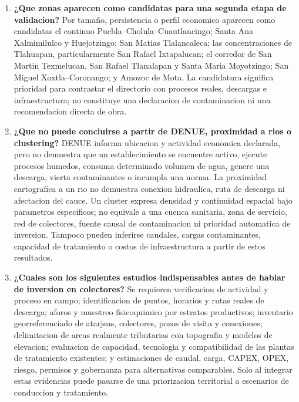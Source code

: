 \documentclass[11pt,letterpaper]{article}
\begin{document}
\begin{enumerate}
    \item \textbf{¿Que zonas aparecen como candidatas para una segunda etapa de validacion?}
    Por tamaño, persistencia o perfil economico aparecen como candidatas el continuo Puebla--Cholula--Cuautlancingo; Santa Ana Xalmimilulco y Huejotzingo; San Matias Tlalancaleca; las concentraciones de Tlahuapan, particularmente San Rafael Ixtapalucan; el corredor de San Martin Texmelucan, San Rafael Tlanalapan y Santa Maria Moyotzingo; San Miguel Xoxtla--Coronango; y Amozoc de Mota. La candidatura significa prioridad para contrastar el directorio con procesos reales, descargas e infraestructura; no constituye una declaracion de contaminacion ni una recomendacion directa de obra.

    \item \textbf{¿Que no puede concluirse a partir de DENUE, proximidad a rios o clustering?}
    DENUE informa ubicacion y actividad economica declarada, pero no demuestra que un establecimiento se encuentre activo, ejecute procesos humedos, consuma determinado volumen de agua, genere una descarga, vierta contaminantes o incumpla una norma. La proximidad cartografica a un rio no demuestra conexion hidraulica, ruta de descarga ni afectacion del cauce. Un cluster expresa densidad y continuidad espacial bajo parametros especificos; no equivale a una cuenca sanitaria, zona de servicio, red de colectores, fuente causal de contaminacion ni prioridad automatica de inversion. Tampoco pueden inferirse caudales, cargas contaminantes, capacidad de tratamiento o costos de infraestructura a partir de estos resultados.

    \item \textbf{¿Cuales son los siguientes estudios indispensables antes de hablar de inversion en colectores?}
    Se requieren verificacion de actividad y proceso en campo; identificacion de puntos, horarios y rutas reales de descarga; aforos y muestreo fisicoquimico por estratos productivos; inventario georreferenciado de atarjeas, colectores, pozos de visita y conexiones; delimitacion de areas realmente tributarias con topografia y modelos de elevacion; evaluacion de capacidad, tecnologia y compatibilidad de las plantas de tratamiento existentes; y estimaciones de caudal, carga, CAPEX, OPEX, riesgo, permisos y gobernanza para alternativas comparables. Solo al integrar estas evidencias puede pasarse de una priorizacion territorial a escenarios de conduccion y tratamiento.
\end{enumerate}
\end{document}
